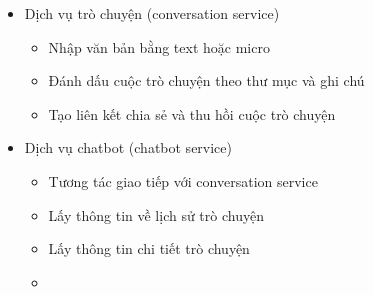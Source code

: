 

\begin{itemize}


\item Dịch vụ trò chuyện (conversation service)


\begin{itemize}


\item Nhập văn bản bằng text hoặc micro
\item Đánh dấu cuộc trò chuyện theo thư mục và ghi chú
\item Tạo liên kết chia sẻ và thu hồi cuộc trò chuyện

\end{itemize}


\item Dịch vụ chatbot (chatbot service)


\begin{itemize}


\item Tương tác giao tiếp với conversation service
\item Lấy thông tin về lịch sử trò chuyện
\item Lấy thông tin chi tiết trò chuyện
\item
\end{itemize}

\end{itemize}
